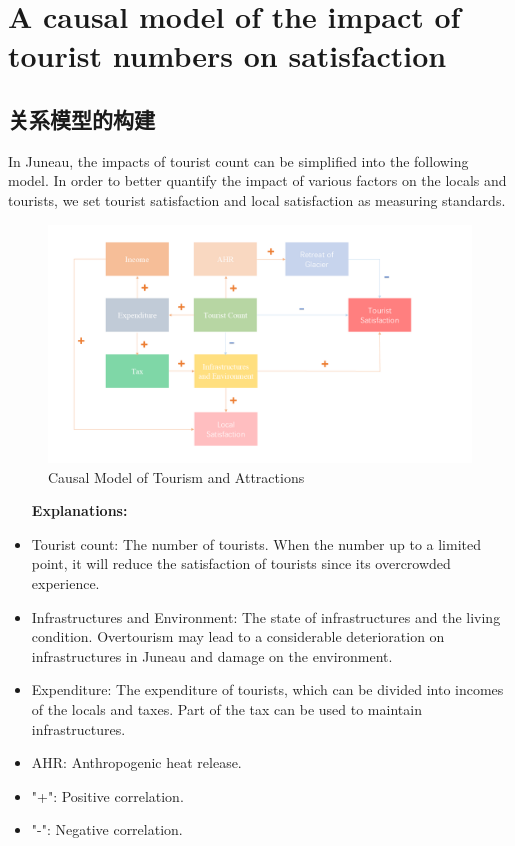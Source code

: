 \documentclass[12pt]{article}  %
\begin{document}
 
 
 \section{A causal model of the impact of tourist numbers on satisfaction}
 \subsection{关系模型的构建}
 In Juneau, the impacts of tourist count can be simplified into the following model. In order to better quantify the impact of various factors on the locals and tourists, we set tourist satisfaction and local satisfaction as measuring standards.
 
 \begin{figure}[htbp]  %
 
    \centering  %
    \includegraphics[width=1.2\textwidth]{chart1.png} %
    \caption{Causal Model of Tourism and Attractions} %
    \label{fig1}%
    \end{figure}
 

 \begin{itemize}
     \setlength{\parsep}{0ex} %
     \setlength{\topsep}{2ex} %
     \setlength{\itemsep}{1ex} %
 \item [\textbf{Explanations:}] 
        \item Tourist count: The number of tourists. When the number up to a limited point, it will reduce the satisfaction of tourists since its overcrowded experience.
        \item Infrastructures and Environment: The state of infrastructures and the living condition. Overtourism may lead to a considerable deterioration on infrastructures in Juneau and damage on the environment.
        \item Expenditure: The expenditure of tourists, which can be divided into incomes of the locals and taxes. Part of the tax can be used to maintain infrastructures.
        \item AHR: Anthropogenic heat release.
        \item "+": Positive correlation.
        \item "-": Negative correlation.\\
 \end{itemize}
\end{document}
